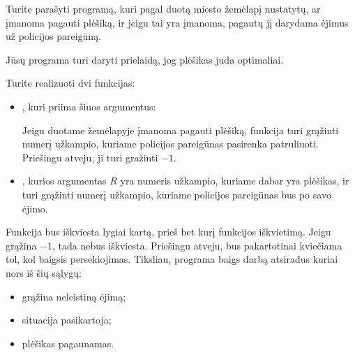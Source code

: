 \documentclass{boi2014-lt}
\begin{document}
    \Task
	Turite parašyti programą, kuri pagal duotą miesto žemėlapį nustatytų,
	ar įmanoma pagauti plėšiką, ir jeigu tai yra įmanoma, pagautų jį
	darydama ėjimus už policijos pareigūną.

	Jūsų programa turi daryti prielaidą, jog plėšikas juda optimaliai.

    \Implementation
    Turite realizuoti dvi funkcijas:
    \begin{itemize}
        \item {}, kuri priima šiuos argumentus:

		Jeigu duotame žemėlapyje įmanoma pagauti plėšiką, funkcija 
		turi grąžinti numerį užkampio, kuriame policijos pareigūnas pasirenka
		patruliuoti. Priešingu atveju, ji turi gražinti $-1$.

		\item {}, kurios argumentas $R$ yra numeris užkampio,
			kuriame dabar yra plėšikas, ir turi grąžinti numerį užkampio,
			kuriame policijos pareigūnas bus po savo ėjimo.
    \end{itemize}

    Funkcija  bus iškviesta lygiai kartą, prieš bet kurį
    funkcijos  iškvietimą. Jeigu  grąžina
    $-1$, tada  nebus iškviesta. Priešingu atveju,
	 bus pakartotinai kviečiama tol, kol baigsis
	persekiojimas.
    Tiksliau, programa baigs darbą atsiradus kuriai nors iš šių sąlygų:
    \begin{itemize}
        \item {} grąžina neleistiną ėjimą;
        \item situacija pasikartoja;
        \item plėšikas pagaunamas.
    \end{itemize}
\end{document}

